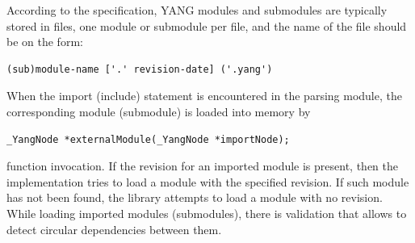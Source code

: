 \documentclass[conference]{IEEEtran}
\begin{document}
According to the specification, YANG modules and submodules are typically stored in files, one module or submodule per file, and the name of the file should be on the form:
\small
\begin{verbatim}
(sub)module-name ['.' revision-date] ('.yang')
\end{verbatim}
\normalsize

When the import (include) statement is encountered in the parsing module, the corresponding module (submodule) is loaded into memory by 
\small
\begin{verbatim}
_YangNode *externalModule(_YangNode *importNode);
\end{verbatim}
\normalsize
function invocation. If the revision for an imported module is present, then the implementation tries to load a module with the specified revision. 
If such module has not been found, the library attempts to load a module with no revision.
While loading imported modules (submodules), there is validation that allows to detect circular dependencies between them.
\end{document}
